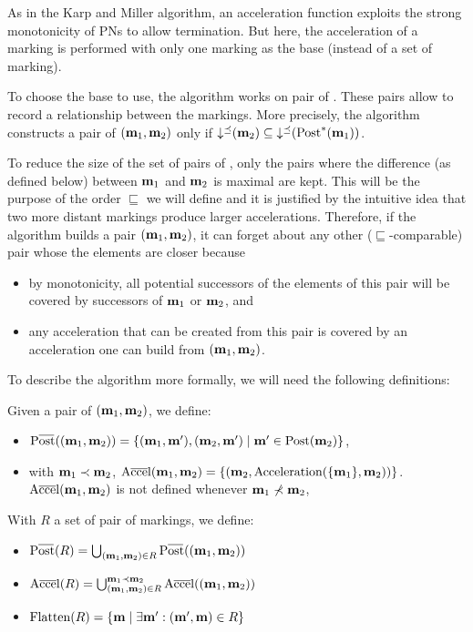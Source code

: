 As in the Karp and Miller algorithm, an acceleration function exploits the strong monotonicity of \acp{PN} to allow termination.
But here, the acceleration of a marking is performed with only one marking as the base (instead of a set of marking).

To choose the base to use, the algorithm works on pair of \omarks.
These pairs allow to record a relationship between the markings.
More precisely, the algorithm constructs a pair of \omarks $(\mathbf{m}_1, \mathbf{m}_2)$ only if $\operatorname{\downarrow^\preceq}(\mathbf{m}_2) \subseteq \operatorname{\downarrow^\preceq}(\operatorname{Post}^*(\mathbf{m}_1))$.

To reduce the size of the set of pairs of \omarks, only the pairs where the difference (as defined below) between $\mathbf{m}_1$ and $\mathbf{m}_2$ is maximal are kept.
This will be the purpose of the order $\sqsubseteq$ we will define and it is justified by the intuitive idea that two more distant markings produce larger accelerations.
Therefore, if the algorithm builds a pair $(\mathbf{m}_1, \mathbf{m}_2)$, it can forget about any other ($\sqsubseteq$-comparable) pair whose the elements are closer because
\begin{itemize}
  \item by monotonicity, all potential successors of the elements of this pair will be covered by successors of $\mathbf{m}_1$ or $\mathbf{m}_2$, and
  \item any acceleration that can be created from this pair is covered by an acceleration one can build from $(\mathbf{m}_1, \mathbf{m}_2)$.
\end{itemize}

To describe the algorithm more formally, we will need the following definitions:

Given a pair of \omarks $(\mathbf{m}_1, \mathbf{m}_2)$, we define:
\begin{itemize}
  \item $\Postb((\mar_1, \mar_2)) = \{(\mar_1, \marp), (\mar_2, \marp) \mid \marp \in \Post(\mar_2)\}$,
  \item with $\mathbf{m}_1 \prec \mathbf{m}_2$, $\operatorname{A\overline{cce}l}(\mathbf{m}_1, \mathbf{m}_2) = \{(\mathbf{m}_2, \operatorname{Acceleration}(\{\mathbf{m}_1\}, \mathbf{m}_2))\}$.
    $\operatorname{A\overline{cce}l}(\mathbf{m}_1, \mathbf{m}_2)$ is not defined whenever $\mathbf{m}_1 \nprec \mathbf{m}_2$,
\end{itemize}

With $R$ a set of pair of markings, we define:
\begin{itemize}
  \item $\Postb(R) = \bigcup_{(\mar_1, \mar_2) \in R} \Postb((\mar_1, \mar_2))$
  \item $\operatorname{A\overline{cce}l}(R) = \bigcup_{(\mathbf{m}_1, \mathbf{m}_2) \in R}^{\mathbf{m}_1 \prec \mathbf{m}_2} \operatorname{A\overline{cce}l}((\mathbf{m}_1, \mathbf{m}_2))$
  \item $\operatorname{Flatten}(R) = \{\mathbf{m} \mid \exists \mathbf{m'} : (\mathbf{m'}, \mathbf{m}) \in R\}$
\end{itemize}

